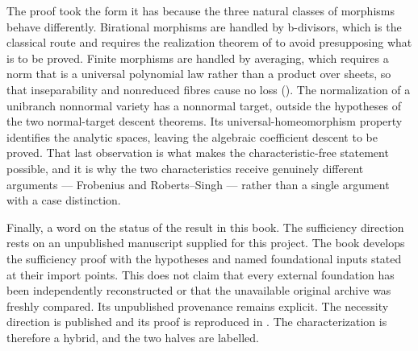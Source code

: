 The proof took the form it has because the three natural classes of
morphisms behave differently.  Birational morphisms are handled by
b-divisors, which is the classical route and requires the realization
theorem of  to avoid presupposing what is
to be proved.  Finite morphisms are handled by averaging, which requires a
norm that is a universal polynomial law rather than a product over sheets,
so that inseparability and nonreduced fibres cause no loss
().  The normalization of a unibranch nonnormal variety has a nonnormal
target, outside the hypotheses of the two normal-target descent theorems.
Its universal-homeomorphism property identifies the analytic spaces, leaving
the algebraic coefficient descent to be proved.  That last observation is what makes the characteristic-free
statement possible, and it is why the two characteristics receive genuinely
different arguments --- Frobenius and Roberts--Singh --- rather than a single
argument with a case distinction.

Finally, a word on the status of the result in this book.  The sufficiency
direction rests on an unpublished manuscript supplied for this project.  The book develops the sufficiency proof with the hypotheses and named
foundational inputs stated at their import points.  This does not claim
that every external foundation has been independently reconstructed or
that the unavailable original archive was freshly compared.  Its
unpublished provenance remains explicit.
The necessity direction is published and its proof is reproduced in
.  The
characterization  is therefore
a hybrid, and the two halves are labelled.
